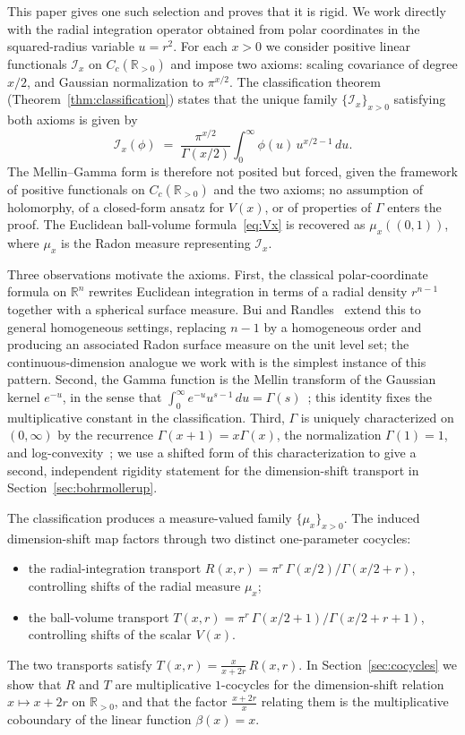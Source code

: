 \documentclass[11pt,a4paper]{article}
\theoremstyle{plain}
\theoremstyle{definition}
\theoremstyle{remark}
\newcommand{\R}{\mathbb{R}}
\newcommand{\Cc}{C_c}
\newcommand{\Iop}{\mathcal{I}}
\begin{document}
This paper gives one such selection and proves that it is rigid. We work directly with the radial integration operator obtained from polar coordinates in the squared-radius variable $u = r^2$. For each $x>0$ we consider positive linear functionals $\Iop_x$ on $\Cc(\R_{>0})$ and impose two axioms: scaling covariance of degree $x/2$, and Gaussian normalization to $\pi^{x/2}$. The classification theorem (Theorem~\ref{thm:classification}) states that the unique family $\{\Iop_x\}_{x>0}$ satisfying both axioms is given by
\[
\Iop_x(\phi) \;=\; \frac{\pi^{x/2}}{\Gamma(x/2)}\int_0^\infty \phi(u)\,u^{x/2-1}\,du.
\]
The Mellin--Gamma form is therefore not posited but forced, given the framework of positive functionals on $\Cc(\R_{>0})$ and the two axioms; no assumption of holomorphy, of a closed-form ansatz for $V(x)$, or of properties of $\Gamma$ enters the proof. The Euclidean ball-volume formula~\eqref{eq:Vx} is recovered as $\mu_x((0,1))$, where $\mu_x$ is the Radon measure representing $\Iop_x$.

Three observations motivate the axioms. First, the classical polar-coordinate formula on $\R^n$ rewrites Euclidean integration in terms of a radial density $r^{n-1}$ together with a spherical surface measure. Bui and Randles~\cite{BuiRandles2022} extend this to general homogeneous settings, replacing $n-1$ by a homogeneous order and producing an associated Radon surface measure on the unit level set; the continuous-dimension analogue we work with is the simplest instance of this pattern. Second, the Gamma function is the Mellin transform of the Gaussian kernel $e^{-u}$, in the sense that $\int_0^\infty e^{-u}u^{s-1}\,du = \Gamma(s)$~\cite[\S 4]{FlajoletGourdonDumas1995}; this identity fixes the multiplicative constant in the classification. Third, $\Gamma$ is uniquely characterized on $(0,\infty)$ by the recurrence $\Gamma(x+1)=x\Gamma(x)$, the normalization $\Gamma(1)=1$, and log-convexity~\cite{Artin1964,MarichalZenaidi2022,MarichalZenaidi2024}; we use a shifted form of this characterization to give a second, independent rigidity statement for the dimension-shift transport in Section~\ref{sec:bohrmollerup}.

The classification produces a measure-valued family $\{\mu_x\}_{x>0}$. The induced dimension-shift map factors through two distinct one-parameter cocycles:
\begin{itemize}[leftmargin=2em,topsep=0pt,itemsep=2pt]
\item the radial-integration transport $R(x,r) = \pi^r\,\Gamma(x/2)/\Gamma(x/2+r)$, controlling shifts of the radial measure $\mu_x$;
\item the ball-volume transport $T(x,r) = \pi^r\,\Gamma(x/2+1)/\Gamma(x/2+r+1)$, controlling shifts of the scalar $V(x)$.
\end{itemize}
The two transports satisfy $T(x,r) = \frac{x}{x+2r}\,R(x,r)$. In Section~\ref{sec:cocycles} we show that $R$ and $T$ are multiplicative $1$-cocycles for the dimension-shift relation $x\mapsto x+2r$ on $\R_{>0}$, and that the factor $\frac{x+2r}{x}$ relating them is the multiplicative coboundary of the linear function $\beta(x) = x$.
\end{document}
